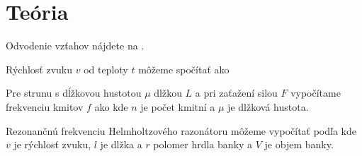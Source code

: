 \section{Teória}
Odvodenie vzťahov nájdete na \cite{C_1}.

Rýchlosť zvuku $v$ od teploty $t$ môžeme spočítať ako

Pre strunu s dĺžkovou hustotou $\mu$ dlžkou $L$ a pri zaťažení silou $F$ vypočítame frekvenciu kmitov $f$ ako
kde $n$ je počet kmitní a $\mu$ je dlžková hustota.


Rezonančnú frekvenciu Helmholtzového razonátoru môžeme vypočítať podľa
kde $v$ je rýchlosť zvuku, $l$ je dlžka a $r$ polomer hrdla banky a $V$ je objem banky.



